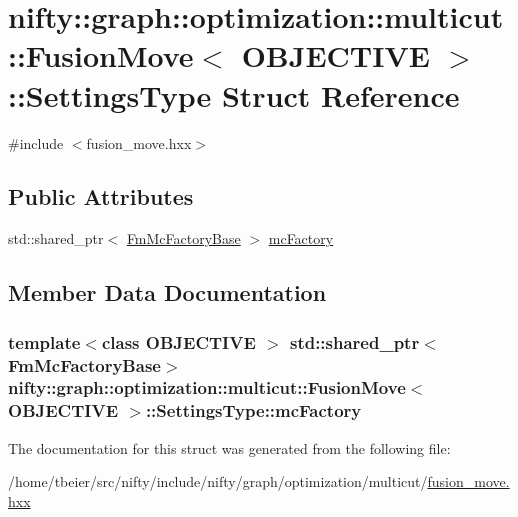 \hypertarget{structnifty_1_1graph_1_1optimization_1_1multicut_1_1FusionMove_1_1SettingsType}{}\section{nifty\+:\+:graph\+:\+:optimization\+:\+:multicut\+:\+:Fusion\+Move$<$ O\+B\+J\+E\+C\+T\+I\+V\+E $>$\+:\+:Settings\+Type Struct Reference}
\label{structnifty_1_1graph_1_1optimization_1_1multicut_1_1FusionMove_1_1SettingsType}


{\ttfamily \#include $<$fusion\+\_\+move.\+hxx$>$}

\subsection*{Public Attributes}
\begin{DoxyCompactItemize}
\item 
std\+::shared\+\_\+ptr$<$ \hyperlink{classnifty_1_1graph_1_1optimization_1_1multicut_1_1FusionMove_a5c77d3bdf410275f9488c2e6dc2f7392}{Fm\+Mc\+Factory\+Base} $>$ \hyperlink{structnifty_1_1graph_1_1optimization_1_1multicut_1_1FusionMove_1_1SettingsType_a69e58eb9ca214af693fdf8319b5b06bd}{mc\+Factory}
\end{DoxyCompactItemize}


\subsection{Member Data Documentation}
\hypertarget{structnifty_1_1graph_1_1optimization_1_1multicut_1_1FusionMove_1_1SettingsType_a69e58eb9ca214af693fdf8319b5b06bd}{}
\subsubsection[{mc\+Factory}]{\setlength{\rightskip}{0pt plus 5cm}template$<$class O\+B\+J\+E\+C\+T\+I\+V\+E $>$ std\+::shared\+\_\+ptr$<${\bf Fm\+Mc\+Factory\+Base}$>$ {\bf nifty\+::graph\+::optimization\+::multicut\+::\+Fusion\+Move}$<$ O\+B\+J\+E\+C\+T\+I\+V\+E $>$\+::Settings\+Type\+::mc\+Factory}\label{structnifty_1_1graph_1_1optimization_1_1multicut_1_1FusionMove_1_1SettingsType_a69e58eb9ca214af693fdf8319b5b06bd}


The documentation for this struct was generated from the following file\+:\begin{DoxyCompactItemize}
\item 
/home/tbeier/src/nifty/include/nifty/graph/optimization/multicut/\hyperlink{multicut_2fusion__move_8hxx}{fusion\+\_\+move.\+hxx}\end{DoxyCompactItemize}
